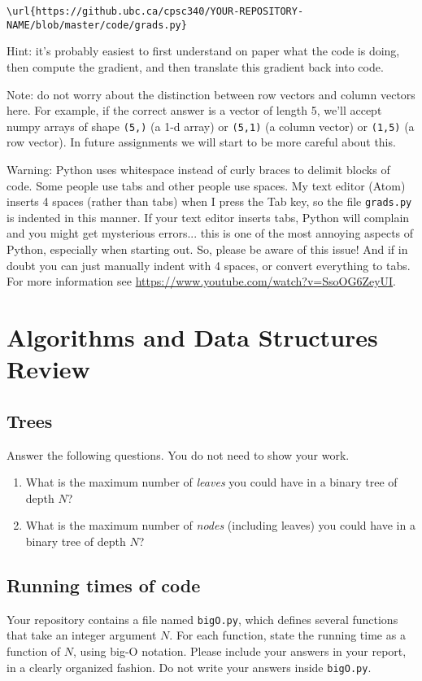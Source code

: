 \documentclass{article}
\def\blu#1{{\color{blu}#1}}
\begin{document}
\begin{verbatim}
\url{https://github.ubc.ca/cpsc340/YOUR-REPOSITORY-NAME/blob/master/code/grads.py}
\end{verbatim}

Hint: it's probably easiest to first understand on paper what the code is doing, then compute
the gradient, and then translate this gradient back into code.

Note: do not worry about the distinction between row vectors and column vectors here.
For example, if the correct answer is a vector of length 5, we'll accept numpy arrays
of shape \texttt{(5,)} (a 1-d array) or \texttt{(5,1)} (a column vector) or
\texttt{(1,5)} (a row vector). In future assignments we will start to be more careful
about this.

Warning: Python uses whitespace instead of curly braces to delimit blocks of code.
Some people use tabs and other people use spaces. My text editor (Atom) inserts 4 spaces (rather than tabs) when
I press the Tab key, so the file \texttt{grads.py} is indented in this manner. If your text editor inserts tabs,
Python will complain and you might get mysterious errors... this is one of the most annoying aspects
of Python, especially when starting out. So, please be aware of this issue! And if in doubt you can just manually
indent with 4 spaces, or convert everything to tabs. For more information
see \url{https://www.youtube.com/watch?v=SsoOG6ZeyUI}.

\section{Algorithms and Data Structures Review}

\subsection{Trees}

\blu{Answer the following questions.} You do not need to show your work.

\begin{enumerate}
\item What is the maximum number of \emph{leaves} you could have in a binary tree of depth $N$?
\item What is the maximum number of \emph{nodes} (including leaves) you could have in a binary tree of depth $N$?
\end{enumerate}

\subsection{Running times of code}

Your repository contains a file named \texttt{bigO.py}, which defines several functions
that take an integer argument $N$. For each function, \blu{state the running time as a function of $N$, using big-O notation}.
Please include your answers in your report, in a clearly organized fashion. Do not write your answers inside \texttt{bigO.py}.
\end{document}
